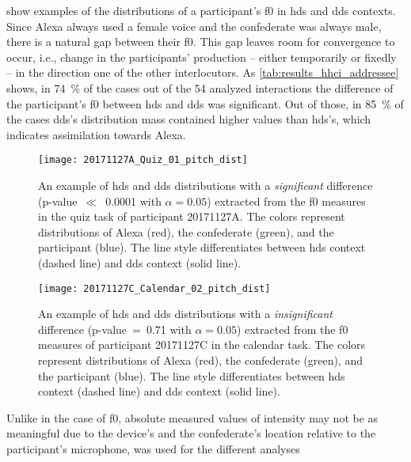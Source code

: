  show examples of the distributions of a participant's \ac{f0} in \ac{hds} and \ac{dds} contexts.
Since Alexa always used a female voice and the confederate was always male, there is a natural gap between their \ac{f0}.
This gap leaves room for convergence to occur, i.e., change in the participants' production -- either temporarily or fixedly -- in the direction one of the other interlocutors.
As \cref{tab:results_hhci_addressee} shows, in \SI{74}{\percent} of the cases out of the 54 analyzed interactions the difference of the participant's \ac{f0} between \ac{hds} and \ac{dds} was significant.
Out of those, in \SI{85}{\percent} of the cases \ac{dds}'s distribution mass contained higher values than \ac{hds}'s, which indicates assimilation towards Alexa.
%
\begin{figure}[t]
	\centering
	\texttt{[image: 20171127A\_Quiz\_01\_pitch\_dist]}
	\caption[An interaction with significant \acs{hds} and \acs{dds} \acs{f0} distributions difference]
		{An example of \ac{hds} and \ac{dds} distributions with a \emph{significant} difference (p-value~$\ll$~0.0001 with $\alpha=0.05$) extracted from the \ac{f0} measures in the quiz task of participant 20171127A.
		The colors represent distributions of Alexa (red), the confederate (green), and the participant (blue).
		The line style differentiates between \ac{hds} context (dashed line) and \ac{dds} context (solid line).}
	\label{fig:hds_dds_dist_signif}
\end{figure}
%
\begin{figure}
	\texttt{[image: 20171127C\_Calendar\_02\_pitch\_dist]}
	\caption[An interaction with insignificant \acs{hds} and \acs{dds} \acs{f0} distributions difference]
		{An example of \ac{hds} and \ac{dds} distributions with a \emph{insignificant} difference (p-value~=~0.71 with $\alpha=0.05$) extracted from the \ac{f0} measures of participant 20171127C in the calendar task.
		The colors represent distributions of Alexa (red), the confederate (green), and the participant (blue).
		The line style differentiates between \ac{hds} context (dashed line) and \ac{dds} context (solid line).}
	\label{fig:hds_dds_dist_nonsignif}
\end{figure}
%
Unlike in the case of \ac{f0}, absolute measured values of intensity may not be as meaningful due to the device's and the confederate's location relative to the participant's microphone, was used for the different analyses
